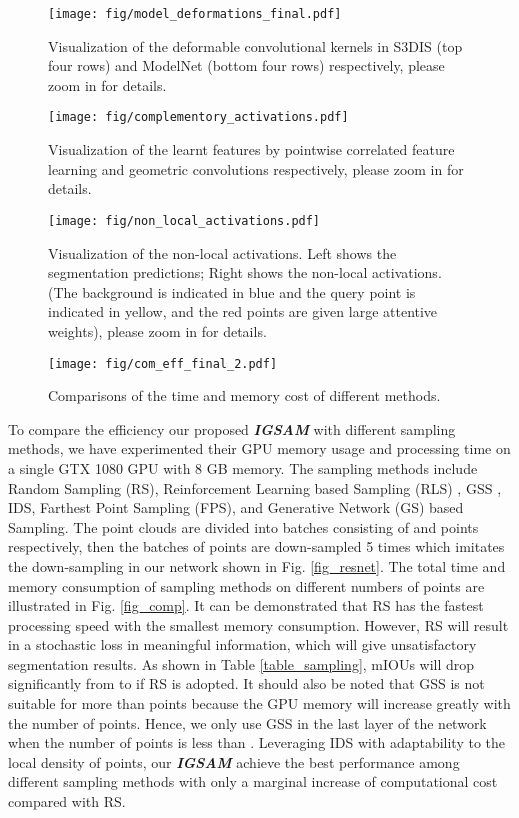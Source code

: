\documentclass[journal]{IEEEtran}
\begin{document}
\begin{figure}[ht]
\centering
\texttt{[image: fig/model\_deformations\_final.pdf]}
\caption{Visualization of the deformable convolutional kernels in S3DIS (top four rows) and ModelNet (bottom four rows) respectively, please zoom in for details.}
\label{deform_s3dis}
\end{figure}
\begin{figure}[ht]
\centering
\texttt{[image: fig/complementory\_activations.pdf]}
\caption{Visualization of the learnt features by pointwise correlated feature learning and geometric convolutions respectively, please zoom in for details.}
\label{fig_activation}
\end{figure}
\begin{figure}[ht]
\centering
\texttt{[image: fig/non\_local\_activations.pdf]}
\caption{Visualization of the non-local activations. Left shows the segmentation predictions; Right shows the non-local activations. (The background is indicated in blue and the query point is indicated in yellow, and the red points are given large attentive weights), please zoom in for details.}
\label{fig_acti}
\end{figure}
\begin{figure}[ht]
\centering
\texttt{[image: fig/com\_eff\_final\_2.pdf]}
\caption{Comparisons of the time and memory cost of different methods.}
\label{fig_eff}
\vspace{-5mm}
\end{figure}
To compare the efficiency our proposed \textit{\textbf{IGSAM}} with different sampling methods, we have experimented their GPU memory usage and processing time on a single GTX 1080 GPU with 8 GB memory. The sampling methods include Random Sampling (RS), Reinforcement Learning based Sampling (RLS) \cite{stadie2018importance}, GSS \cite{maddison2016concrete}, IDS, Farthest Point Sampling (FPS), and Generative Network (GS) \cite{lang2020samplenet} based Sampling. The point clouds are divided into batches consisting of  and  points respectively, then the batches of points are down-sampled 5 times which imitates the down-sampling in our network shown in Fig. \ref{fig_resnet}. The total time and memory consumption of sampling methods on different numbers of points are illustrated in Fig. \ref{fig_comp}. It can be demonstrated that RS has the fastest processing speed with the smallest memory consumption. However, RS will result in a stochastic loss in meaningful information, which will give unsatisfactory segmentation results. As shown in Table \ref{table_sampling}, mIOUs will drop significantly from  to  if RS is adopted. It should also be noted that GSS is not suitable for more than  points because the GPU memory will increase greatly with the number of points. Hence, we only use GSS in the last layer of the network when the number of points is less than . Leveraging IDS with adaptability to the local density of points, our \textit{\textbf{IGSAM}} achieve the best performance among different sampling methods with only a marginal increase of computational cost compared with RS.
\end{document}
